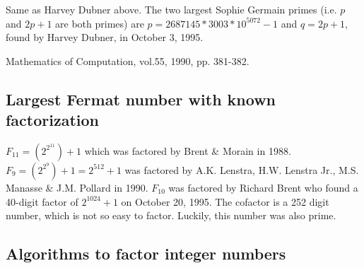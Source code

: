 %
 
 Same as Harvey Dubner above. 
The two largest Sophie Germain primes (i.e. $p$ and $2p+1$ are both primes)
are $p=2687145 * 3003 * 10^{5072} - 1$ and $q=2p + 1$, found by Harvey
Dubner, in October 3, 1995. 



\Ref

   { Mathematics of Computation,}{ vol.55, 1990, pp. 381-382. }


\subsection{Largest Fermat number with known factorization}

 $ F_{11} = (2^{2^{11}}) + 1$ which was  factored by Brent \& Morain in
    1988. $F_9 = (2^{2^9}) + 1 = 2^{512} + 1$ was factored by 
    A.K. Lenstra, H.W. Lenstra Jr., M.S. Manasse \& J.M. Pollard
    in 1990. %
    $F_{10}$ was factored by Richard Brent who found a 40-digit factor 
    of $2^{1024} + 1$ on October 20, 1995. The cofactor is
   a 252 digit number, which is not so easy to factor. Luckily, 
   this number was also prime.



\subsection{Algorithms to factor integer numbers}

